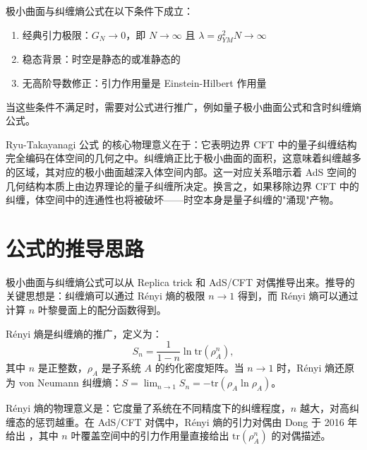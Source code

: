 \begin{note}[适用条件]
极小曲面与纠缠熵公式在以下条件下成立：
\begin{enumerate}
    \item 经典引力极限：$G_N \to 0$，即 $N \to \infty$ 且 $\lambda = g_{YM}^2 N \to \infty$
    \item 稳态背景：时空是静态的或准静态的
    \item 无高阶导数修正：引力作用量是 Einstein-Hilbert 作用量
\end{enumerate}
当这些条件不满足时，需要对公式进行推广，例如量子极小曲面公式和含时纠缠熵公式。
\end{note}

\begin{remark}[RT 公式的物理意义]
Ryu-Takayanagi 公式 \cite{Ryu2006} 的核心物理意义在于：它表明边界 CFT 中的量子纠缠结构完全编码在体空间的几何之中。纠缠熵正比于极小曲面的面积，这意味着纠缠越多的区域，其对应的极小曲面越深入体空间内部。这一对应关系暗示着 AdS 空间的几何结构本质上由边界理论的量子纠缠所决定。换言之，如果移除边界 CFT 中的纠缠，体空间中的连通性也将被破坏——时空本身是量子纠缠的"涌现"产物。
\end{remark}

\section{公式的推导思路}

极小曲面与纠缠熵公式可以从 Replica trick 和 AdS/CFT 对偶推导出来。推导的关键思想是：纠缠熵可以通过 Rényi 熵的极限 $n \to 1$ 得到，而 Rényi 熵可以通过计算 $n$ 叶黎曼面上的配分函数得到。

\begin{definition}[Rényi 熵]
Rényi 熵是纠缠熵的推广，定义为：
\begin{equation}
    S_n = \frac{1}{1-n} \ln \text{tr}(\rho_A^n),
\end{equation}
其中 $n$ 是正整数，$\rho_A$ 是子系统 $A$ 的约化密度矩阵。当 $n \to 1$ 时，Rényi 熵还原为 von Neumann 纠缠熵：$S = \lim_{n \to 1} S_n = -\text{tr}(\rho_A \ln \rho_A)$。
\end{definition}

\begin{remark}
Rényi 熵的物理意义是：它度量了系统在不同精度下的纠缠程度，$n$ 越大，对高纠缠态的惩罚越重。在 AdS/CFT 对偶中，Rényi 熵的引力对偶由 Dong 于 2016 年给出 \cite{Dong2016}，其中 $n$ 叶覆盖空间中的引力作用量直接给出 $\text{tr}(\rho_A^n)$ 的对偶描述。
\end{remark}

